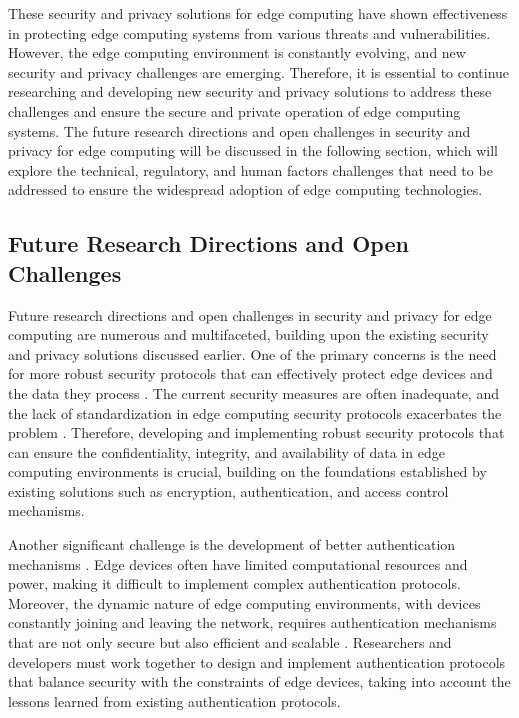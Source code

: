 \documentclass[11pt]{article}
\begin{document}
These security and privacy solutions for edge computing have shown effectiveness in protecting edge computing systems from various threats and vulnerabilities. However, the edge computing environment is constantly evolving, and new security and privacy challenges are emerging. Therefore, it is essential to continue researching and developing new security and privacy solutions to address these challenges and ensure the secure and private operation of edge computing systems. The future research directions and open challenges in security and privacy for edge computing will be discussed in the following section, which will explore the technical, regulatory, and human factors challenges that need to be addressed to ensure the widespread adoption of edge computing technologies.

\subsection{Future Research Directions and Open Challenges}

Future research directions and open challenges in security and privacy for edge computing are numerous and multifaceted, building upon the existing security and privacy solutions discussed earlier. One of the primary concerns is the need for more robust security protocols that can effectively protect edge devices and the data they process \cite{ref107}. The current security measures are often inadequate, and the lack of standardization in edge computing security protocols exacerbates the problem \cite{ref92}. Therefore, developing and implementing robust security protocols that can ensure the confidentiality, integrity, and availability of data in edge computing environments is crucial, building on the foundations established by existing solutions such as encryption, authentication, and access control mechanisms.

Another significant challenge is the development of better authentication mechanisms \cite{ref96}. Edge devices often have limited computational resources and power, making it difficult to implement complex authentication protocols. Moreover, the dynamic nature of edge computing environments, with devices constantly joining and leaving the network, requires authentication mechanisms that are not only secure but also efficient and scalable \cite{ref108}. Researchers and developers must work together to design and implement authentication protocols that balance security with the constraints of edge devices, taking into account the lessons learned from existing authentication protocols.
\end{document}
